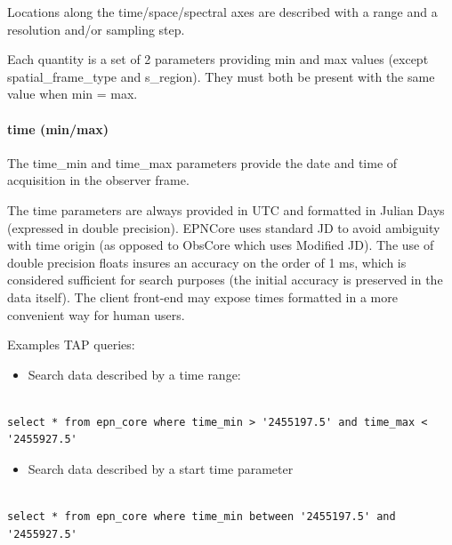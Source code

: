 \documentclass[11pt,a4paper]{ivoa}
\begin{document}
Locations along the time/space/spectral axes are described with a range and a resolution and/or sampling step. 

Each quantity is a set of 2 parameters providing min and max values (except spatial\_frame\_type and s\_region). They must both be present with the same value when min = max.

\paragraph{time (min/max)}

The time\_min and time\_max parameters provide the date and time of acquisition in the observer frame. 

The time parameters are always provided in UTC and formatted in Julian Days (expressed in double precision). EPNCore uses standard JD to avoid ambiguity with time origin (as opposed to ObsCore which uses Modified JD). The use of double precision floats insures an accuracy on the order of 1 ms, which is considered sufficient for search purposes (the initial accuracy is preserved in the data itself).  The client front-end may expose times formatted in a more convenient way for human users.

Examples TAP queries:

\begin{itemize}

\item Search data described by a time range:

\end{itemize}

\begin{verbatim}

select * from epn_core where time_min > '2455197.5' and time_max < '2455927.5'

\end{verbatim}

\begin{itemize}

\item Search data described by a start time parameter

\end{itemize}

\begin{verbatim}

select * from epn_core where time_min between '2455197.5' and '2455927.5'

\end{verbatim}
\end{document}
